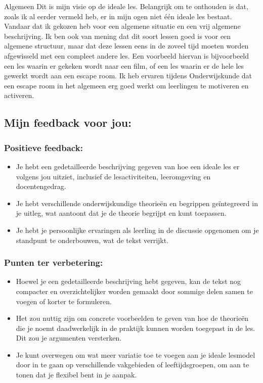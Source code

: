 \documentclass{article}
\begin{document}
{                Algemeen
                Dit is mijn visie op de ideale les. Belangrijk om te onthouden is dat, zoals ik al eerder vermeld heb, er in mijn ogen niet één ideale les bestaat. Vandaar dat ik gekozen heb voor een algemene situatie en een vrij algemene beschrijving. Ik ben ook van mening dat dit soort lessen goed is voor een algemene structuur, maar dat deze lessen eens in de zoveel tijd moeten worden afgewisseld met een compleet andere les. Een voorbeeld hiervan is bijvoorbeeld een les waarin er gekeken wordt naar een film, of een les waarin er de hele les gewerkt wordt aan een escape room. Ik heb ervaren tijdens Onderwijskunde dat een escape room in het algemeen erg goed werkt om leerlingen te motiveren en activeren.}

        \bigskip
            
        \subsection*{Mijn feedback voor jou:}
            \subsubsection*{Positieve feedback:}
                \begin{itemize}
                \item Je hebt een gedetailleerde beschrijving gegeven van hoe een ideale les er volgens jou uitziet, inclusief de lesactiviteiten, leeromgeving en docentengedrag.
                \item Je hebt verschillende onderwijskundige theorieën en begrippen geïntegreerd in je uitleg, wat aantoont dat je de theorie begrijpt en kunt toepassen.
                \item Je hebt je persoonlijke ervaringen als leerling in de discussie opgenomen om je standpunt te onderbouwen, wat de tekst verrijkt.
            \end{itemize}
            \subsubsection*{Punten ter verbetering:}
            \begin{itemize}
                \item Hoewel je een gedetailleerde beschrijving hebt gegeven, kan de tekst nog compacter en overzichtelijker worden gemaakt door sommige delen samen te voegen of korter te formuleren.
                \item Het zou nuttig zijn om concrete voorbeelden te geven van hoe de theorieën die je noemt daadwerkelijk in de praktijk kunnen worden toegepast in de les. Dit zou je argumenten versterken.
                \item Je kunt overwegen om wat meer variatie toe te voegen aan je ideale lesmodel door in te gaan op verschillende vakgebieden of leeftijdsgroepen, om aan te tonen dat je flexibel bent in je aanpak.
            \end{itemize}
\end{document}

